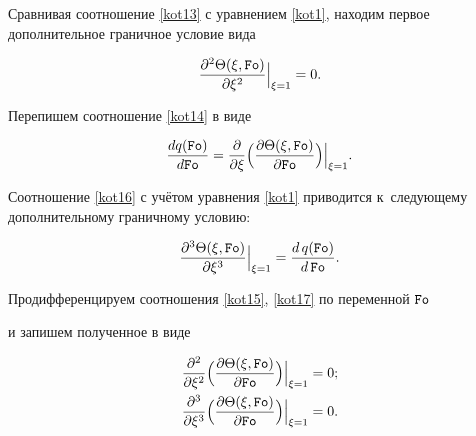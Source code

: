 Сравнивая соотношение \eqref{kot13} с уравнением \eqref{kot1}, находим первое дополнительное граничное условие вида

\begin{equation}

\label{kot15}

\frac{\partial^2\Theta(\xi,\mbox{\tt Fo})}{\partial\xi^2}\Big|_{\xi=1}=0.

\end{equation}

Перепишем соотношение \eqref{kot14} в виде

\begin{equation}

\label{kot16}

\frac{dq(\mbox{\tt Fo})}{d\mbox{\tt Fo}}=\frac{\partial}{\partial\xi}\Bigl(\frac{\partial\Theta(\xi ,{\tt Fo})}{\partial\mbox{\tt Fo}}\Bigr)\Big|_{\xi=1}.

\end{equation}



Соотношение \eqref{kot16} с учётом уравнения \eqref{kot1} приводится к~следующему дополнительному граничному условию:

\begin{equation}

\label{kot17}

\frac{\partial^3\Theta(\xi,\mbox{\tt Fo})}{\partial\xi^3}\Big|_{\xi=1}=

\frac{d\,q(\mbox{\tt Fo})}{d\,\mbox{\tt Fo}}.

\end{equation}





Продифференцируем соотношения \eqref{kot15}, \eqref{kot17} по переменной $\mbox{\tt Fo}$

и запишем полученное  в виде

\begin{gather}

\label{kot20}

\frac{\partial^2}{\partial\xi^2}\Bigl(\frac{\partial\Theta(\xi,\mbox{\tt Fo})}{\partial\mbox{\tt Fo}}\Bigr)\Big|_{\xi=1}=0;

\\

\label{kot21}

\frac{\partial^3}{\partial\xi^3}\Bigl(\frac{\partial\Theta(\xi,\mbox{\tt Fo})}{\partial\mbox{\tt Fo}}\Bigr)\Big|_{\xi=1}=0.

\end{gather}



